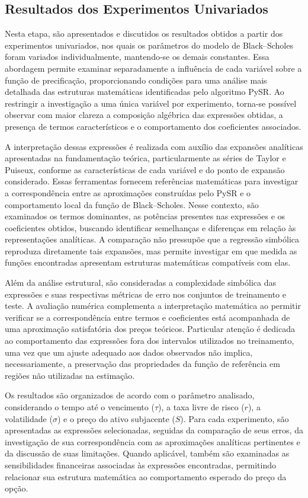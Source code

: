 \subsection{Resultados dos Experimentos Univariados}
\label{sec:resultados_univariados}
Nesta etapa, são apresentados e discutidos os resultados obtidos a partir dos experimentos univariados, nos quais os parâmetros do modelo de Black--Scholes foram variados individualmente, mantendo-se os demais constantes. Essa abordagem permite examinar separadamente a influência de cada variável sobre a função de precificação, proporcionando condições para uma análise mais detalhada das estruturas matemáticas identificadas pelo algoritmo PySR. Ao restringir a investigação a uma única variável por experimento, torna-se possível observar com maior clareza a composição algébrica das expressões obtidas, a presença de termos característicos e o comportamento dos coeficientes associados.

A interpretação dessas expressões é realizada com auxílio das expansões analíticas apresentadas na fundamentação teórica, particularmente as séries de Taylor e Puiseux, conforme as características de cada variável e do ponto de expansão considerado. Essas ferramentas fornecem referências matemáticas para investigar a correspondência entre as aproximações construídas pelo PySR e o comportamento local da função de Black--Scholes. Nesse contexto, são examinados os termos dominantes, as potências presentes nas expressões e os coeficientes obtidos, buscando identificar semelhanças e diferenças em relação às representações analíticas. A comparação não pressupõe que a regressão simbólica reproduza diretamente tais expansões, mas permite investigar em que medida as funções encontradas apresentam estruturas matemáticas compatíveis com elas.

Além da análise estrutural, são consideradas a complexidade simbólica das expressões e suas respectivas métricas de erro nos conjuntos de treinamento e teste. A avaliação numérica complementa a interpretação matemática ao permitir verificar se a correspondência entre termos e coeficientes está acompanhada de uma aproximação satisfatória dos preços teóricos. Particular atenção é dedicada ao comportamento das expressões fora dos intervalos utilizados no treinamento, uma vez que um ajuste adequado aos dados observados não implica, necessariamente, a preservação das propriedades da função de referência em regiões não utilizadas na estimação.

Os resultados são organizados de acordo com o parâmetro analisado, considerando o tempo até o vencimento ($\tau$), a taxa livre de risco ($r$), a volatilidade ($\sigma$) e o preço do ativo subjacente ($S$). Para cada experimento, são apresentadas as expressões selecionadas, seguidas da comparação de seus erros, da investigação de sua correspondência com as aproximações analíticas pertinentes e da discussão de suas limitações. Quando aplicável, também são examinadas as sensibilidades financeiras associadas às expressões encontradas, permitindo relacionar sua estrutura matemática ao comportamento esperado do preço da opção.

